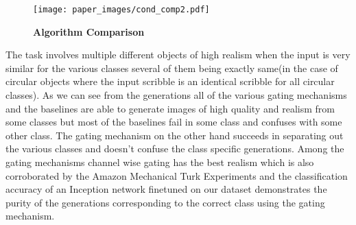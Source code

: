 \begin{figure}[h]
    \centering
    \texttt{[image: paper\_images/cond\_comp2.pdf]}
    \caption{{\bf Algorithm Comparison} \label{fig:alg_comp} }
    \vspace{-4mm}
\end{figure}

The task involves multiple different objects of high realism when the input is very similar for the various classes several of them being exactly same(in the case of circular objects where the input scribble is an identical scribble for all circular classes). As we can see from the generations  all of the various gating mechanisms and the baselines are able to generate images of high quality and realism from some classes but most of the baselines fail in some class and confuses with some other class. The gating mechanism on the other hand succeeds in separating out the various classes and doesn't confuse the class specific generations. Among the gating mechanisms channel wise gating has the best realism which is also corroborated by the Amazon Mechanical Turk Experiments and the classification accuracy of an Inception network finetuned on our dataset demonstrates the purity of the generations corresponding to the correct class using the gating mechanism.  




